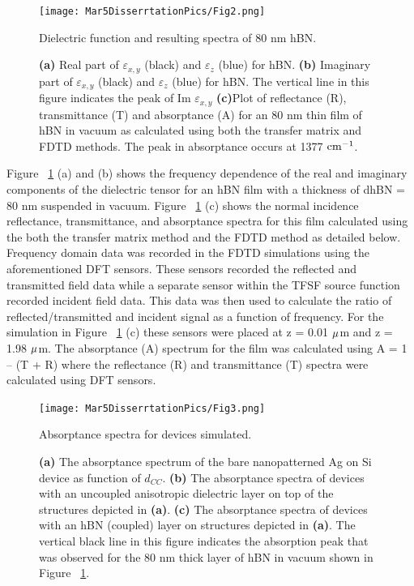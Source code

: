 \documentclass[12pt]{report}
\begin{document}
      \begin{figure}[!htb]
        \centering\texttt{[image: Mar5DisserrtationPics/Fig2.png]}
        \caption{Dielectric function and resulting spectra of 80 nm hBN.}
        \caption*{\textbf{(a)} Real part of $\varepsilon_{x,y}$ (black) and $\varepsilon_{z}$ (blue) for hBN. \textbf{(b)} Imaginary part of $\varepsilon_{x,y}$ (black) and $\varepsilon_{z}$ (blue) for hBN. The vertical line in this figure indicates the peak of Im $\varepsilon_{x,y}$ \textbf{(c)}Plot of reflectance (R), transmittance (T) and absorptance (A) for an 80 nm thin film of hBN in vacuum as calculated using both the transfer matrix and FDTD methods. The peak in absorptance occurs at 1377 $\rm cm^{-1}$.}
        \label{fig:2}
      \end{figure}

    Figure ~\ref{fig:2} (a) and (b) shows the frequency dependence of the real and imaginary components of the dielectric tensor for an hBN film with a thickness of dhBN = 80 nm suspended in vacuum. Figure ~\ref{fig:2} (c) shows the normal incidence reflectance, transmittance, and absorptance spectra for this film calculated using the both the transfer matrix method and the FDTD method as detailed below. Frequency domain data was recorded in the FDTD simulations using the aforementioned DFT sensors. These sensors recorded the reflected and transmitted field data while a separate sensor within the TFSF source function recorded incident field data. This data was then used to calculate the ratio of reflected/transmitted and incident signal as a function of frequency. For the simulation in Figure ~\ref{fig:2} (c) these sensors were placed at z = 0.01 $\rm \mu$m and z = 1.98 $\rm \mu$m. The absorptance (A) spectrum for the film was calculated using A = 1 – (T + R) where the reflectance (R) and transmittance (T) spectra were calculated using DFT sensors.
    \\

      \begin{figure}[!htb]
        \centering\texttt{[image: Mar5DisserrtationPics/Fig3.png]}
        \caption{Absorptance spectra for devices simulated.}
        \caption*{\textbf{(a)} The absorptance spectrum of the bare nanopatterned Ag on Si device as function of $d_{CC}$. \textbf{(b)} The absorptance spectra of devices with an uncoupled anisotropic dielectric layer on top of the structures depicted in \textbf{(a)}. \textbf{(c)} The absorptance spectra of devices with an hBN (coupled) layer on structures depicted in \textbf{(a)}. The vertical black line in this figure indicates the absorption peak that was observed for the 80 nm thick layer of hBN in vacuum shown in Figure ~\ref{fig:2}.}
        \label{fig:3}
      \end{figure}
\end{document}
